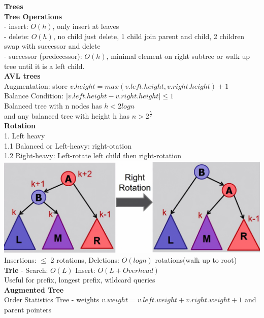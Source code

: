 \documentclass[10pt, a4paper]{article}
\begin{document}
\begin{multicols*}{3}
		{\normalsize\textbf{Trees}}\\
		\textbf{Tree Operations}\\
		- insert: $O(h)$, only insert at leaves\\
		- delete: $O(h)$, no child just delete, 1 child join parent and child, 2 children swap with successor and delete\\
		- successor (predecessor): $O(h)$, minimal element on right subtree or walk up tree until it is a left child. \\
		\textbf{AVL trees}\\
		Augmentation: store $v.height = max(v.left.height, v.right.height) + 1$\\
		Balance Condition: $|v.left.height - v.right.height| \leq 1$\\
		Balanced tree with n nodes has
		$h < 2logn$\\ and any balanced tree with height h has $ n > 2^{\frac{h}{2}}$\\
		\textbf{Rotation}\\
		1. Left heavy\\
		1.1 Balanced or Left-heavy: right-otation\\
		1.2 Right-heavy: Left-rotate left child then right-rotation\\
		\includegraphics[scale=.07]{Rotation}\\
		Insertions: $\leq$ 2 rotations, Deletions: $O(logn)$ rotations(walk up to root)\\
		\textbf{Trie} - Search: $O(L)$ Insert: $O(L + Overhead)$\\
		Useful for prefix, longest prefix, wildcard queries\\
		\textbf{Augmented Tree}\\
		Order Statistics Tree - weights $v.weight = v.left.weight + v.right.weight + 1$ and parent pointers\\

\end{multicols*}
\end{document}
